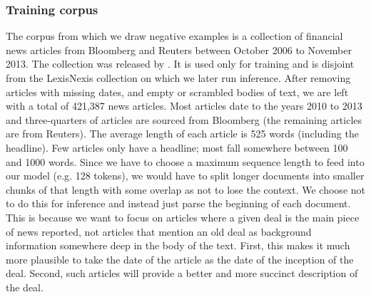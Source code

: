 \subsubsection{Training corpus}
The corpus from which we draw negative examples is a collection of financial news articles from Bloomberg and Reuters between October 2006 to November 2013. The collection was released by \citet{ding2014using}. It is used only for training and is disjoint from the LexisNexis collection on which we later run inference. After removing articles with missing dates, and empty or scrambled bodies of text, we are left with a total of 421,387 news articles. Most articles date to the years 2010 to 2013 and three-quarters of articles are sourced from Bloomberg (the remaining articles are from Reuters). The average length of each article is 525 words (including the headline). Few articles only have a headline; most fall somewhere between 100 and 1000 words. Since we have to choose a maximum sequence length to feed into our model (e.g. 128 tokens), we would have to split longer documents into smaller chunks of that length with some overlap as not to lose the context. We choose not to do this for inference and instead just parse the beginning of each document. This is because we want to focus on articles where a given deal is the main piece of news reported, not articles that mention an old deal as background information somewhere deep in the body of the text. First, this makes it much more plausible to take the date of the article as the date of the inception of the deal. Second, such articles will provide a better and more succinct description of the deal.

